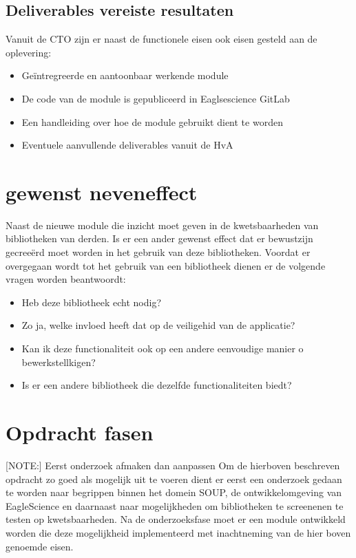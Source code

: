 \subsection{Deliverables vereiste resultaten}\label{subsec:deliverables-vereiste-resultaten}
Vanuit de CTO zijn er naast de functionele eisen ook eisen gesteld aan de oplevering:
\begin{itemize}
\item Geïntregreerde en aantoonbaar werkende module
\item De code van de module is gepubliceerd in Eaglsescience GitLab
\item Een handleiding over hoe de module gebruikt dient te worden
\item Eventuele aanvullende deliverables vanuit de HvA
\end{itemize}

\section{gewenst neveneffect}
Naast de nieuwe module die inzicht moet geven in de kwetsbaarheden van bibliotheken van derden. Is er een ander gewenst effect dat er bewustzijn gecreeërd moet worden in het gebruik van deze bibliotheken. Voordat er overgegaan wordt tot het gebruik van een bibliotheek dienen er de volgende vragen worden beantwoordt:
\begin{itemize}
	\item Heb deze bibliotheek echt nodig?
	\item Zo ja, welke invloed heeft dat op de veiligehid van de applicatie?
	\item Kan ik deze functionaliteit ook op een andere eenvoudige manier o bewerkstellkigen?
	\item Is er een andere bibliotheek die dezelfde functionaliteiten biedt?

\end{itemize}


\section{Opdracht fasen}\label{sec:opdracht-fasen}
[NOTE:] Eerst onderzoek afmaken dan aanpassen
Om de hierboven beschreven opdracht zo goed als mogelijk uit te voeren dient er eerst een onderzoek gedaan te worden naar begrippen binnen het domein SOUP, de ontwikkelomgeving van EagleScience en daarnaast naar mogelijkheden om bibliotheken te screenenen te testen op kwetsbaarheden. Na de onderzoeksfase moet er een module ontwikkeld worden die deze mogelijkheid implementeerd met inachtneming van de  hier boven genoemde eisen.


